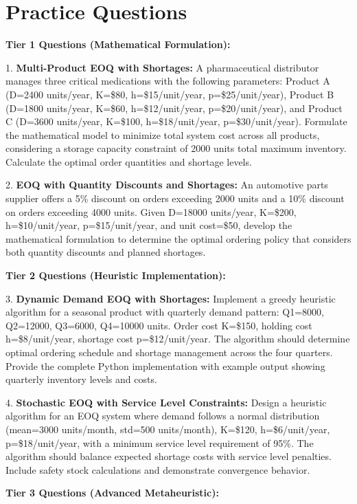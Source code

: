 \documentclass{article}
\begin{document}
\section{Practice Questions}

\textbf{Tier 1 Questions (Mathematical Formulation):}

1. \textbf{Multi-Product EOQ with Shortages:} A pharmaceutical distributor manages three critical medications with the following parameters: Product A (D=2400 units/year, K=\$80, h=\$15/unit/year, p=\$25/unit/year), Product B (D=1800 units/year, K=\$60, h=\$12/unit/year, p=\$20/unit/year), and Product C (D=3600 units/year, K=\$100, h=\$18/unit/year, p=\$30/unit/year). Formulate the mathematical model to minimize total system cost across all products, considering a storage capacity constraint of 2000 units total maximum inventory. Calculate the optimal order quantities and shortage levels.

2. \textbf{EOQ with Quantity Discounts and Shortages:} An automotive parts supplier offers a 5\% discount on orders exceeding 2000 units and a 10\% discount on orders exceeding 4000 units. Given D=18000 units/year, K=\$200, h=\$10/unit/year, p=\$15/unit/year, and unit cost=\$50, develop the mathematical formulation to determine the optimal ordering policy that considers both quantity discounts and planned shortages.

\textbf{Tier 2 Questions (Heuristic Implementation):}

3. \textbf{Dynamic Demand EOQ with Shortages:} Implement a greedy heuristic algorithm for a seasonal product with quarterly demand pattern: Q1=8000, Q2=12000, Q3=6000, Q4=10000 units. Order cost K=\$150, holding cost h=\$8/unit/year, shortage cost p=\$12/unit/year. The algorithm should determine optimal ordering schedule and shortage management across the four quarters. Provide the complete Python implementation with example output showing quarterly inventory levels and costs.

4. \textbf{Stochastic EOQ with Service Level Constraints:} Design a heuristic algorithm for an EOQ system where demand follows a normal distribution (mean=3000 units/month, std=500 units/month), K=\$120, h=\$6/unit/year, p=\$18/unit/year, with a minimum service level requirement of 95\%. The algorithm should balance expected shortage costs with service level penalties. Include safety stock calculations and demonstrate convergence behavior.

\textbf{Tier 3 Questions (Advanced Metaheuristic):}
\end{document}

